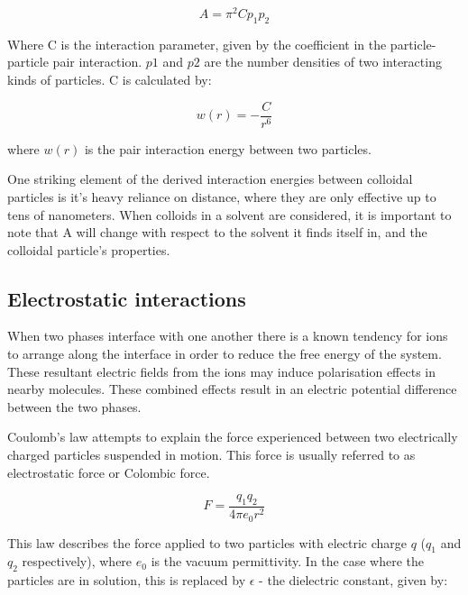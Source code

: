 \begin{equation} %
A = \pi^2 C p_1 p_2
\end{equation}

Where C is the interaction parameter, given by the coefficient in the particle-particle pair interaction. $p1$ and $p2$ are the number densities of two interacting kinds of particles.\cite{?} C is calculated by:

\begin{equation}
w(r) = - \frac{C}{r^6}
\end{equation}

where $w(r)$ is the pair interaction energy between two particles.

One striking element of the derived interaction energies between colloidal particles is it's heavy reliance on distance, where they are only effective up to tens of nanometers. When colloids in a solvent are considered, it is important to note that A will change with respect to the solvent it finds itself in, and the colloidal particle's properties.\cite{?} %


\subsection{Electrostatic interactions} %

When two phases interface with one another there is a known tendency for ions to arrange along the interface in order to reduce the free energy of the system. These resultant electric fields from the ions may induce polarisation effects in nearby molecules. These combined effects result in an electric potential difference between the two phases.

Coulomb's law attempts to explain the force experienced between two electrically charged particles suspended in motion. This force is usually referred to as electrostatic force or Colombic force.

\begin{equation} %
F = \frac{q_1q_2}{4 \pi e_0 r^2}
\end{equation}

This law describes the force applied to two particles with electric charge $q$ ($q_1$ and $q_2$ respectively), where $e_0$ is the vacuum permittivity. In the case where the particles are in solution, this is replaced by $\epsilon$ - the dielectric constant, given by: 

